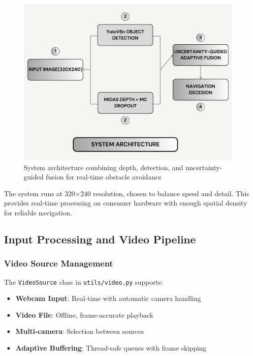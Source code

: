 \documentclass[12pt,oneside]{book}
\begin{document}
\begin{figure}[p]
\centering
\includegraphics[width=1\textwidth,height=0.85\textheight,keepaspectratio]{system_architecture.png}
\vspace{1cm}
\caption{System architecture combining depth, detection, and uncertainty-guided fusion for real-time obstacle avoidance}
\label{fig:architecture}
\end{figure}

The system runs at 320$\times$240 resolution, chosen to balance speed and detail. This provides real-time processing on consumer hardware with enough spatial density for reliable navigation.

\subsection{Input Processing and Video Pipeline}

\subsubsection{Video Source Management}

The \texttt{VideoSource} class in \texttt{utils/video.py} supports:
\begin{itemize}
\item \textbf{Webcam Input}: Real-time with automatic camera handling
\item \textbf{Video File}: Offline, frame-accurate playback
\item \textbf{Multi-camera}: Selection between sources
\item \textbf{Adaptive Buffering}: Thread-safe queues with frame skipping
\end{itemize}
\end{document}

